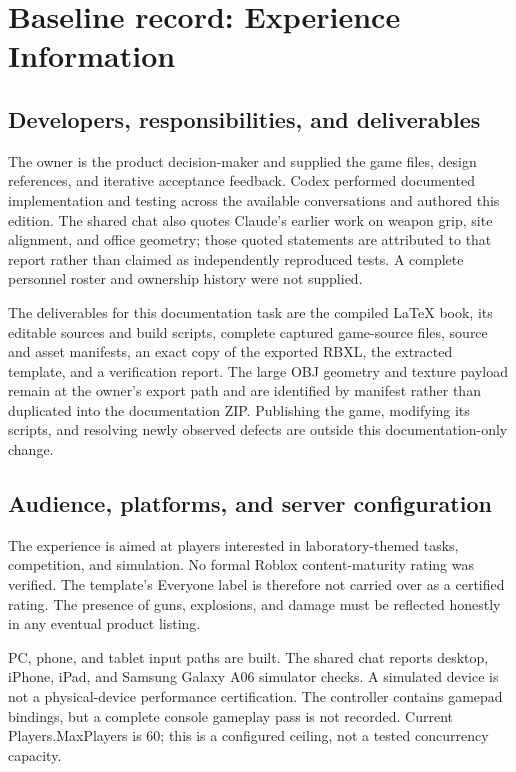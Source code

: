 \chapter{Baseline record: Experience Information}
\section{Developers, responsibilities, and deliverables}
The owner is the product decision-maker and supplied the game files, design references, and iterative acceptance feedback.\allowbreak{} Codex performed documented implementation and testing across the available conversations and authored this edition.\allowbreak{} The shared chat also quotes Claude's earlier work on weapon grip, site alignment, and office geometry; those quoted statements are attributed to that report rather than claimed as independently reproduced tests.\allowbreak{} A complete personnel roster and ownership history were not supplied.\allowbreak{}

The deliverables for this documentation task are the compiled LaTeX book, its editable sources and build scripts, complete captured game-source files, source and asset manifests, an exact copy of the exported RBXL, the extracted template, and a verification report.\allowbreak{} The large OBJ geometry and texture payload remain at the owner's export path and are identified by manifest rather than duplicated into the documentation ZIP.\allowbreak{} Publishing the game, modifying its scripts, and resolving newly observed defects are outside this documentation-only change.\allowbreak{}

\section{Audience, platforms, and server configuration}
The experience is aimed at players interested in laboratory-themed tasks, competition, and simulation.\allowbreak{} No formal Roblox content-maturity rating was verified.\allowbreak{} The template's Everyone label is therefore not carried over as a certified rating.\allowbreak{} The presence of guns, explosions, and damage must be reflected honestly in any eventual product listing.\allowbreak{}

PC, phone, and tablet input paths are built.\allowbreak{} The shared chat reports desktop, iPhone, iPad, and Samsung Galaxy A06 simulator checks.\allowbreak{} A simulated device is not a physical-device performance certification.\allowbreak{} The controller contains gamepad bindings, but a complete console gameplay pass is not recorded.\allowbreak{} Current Players.\allowbreak{}MaxPlayers is 60; this is a configured ceiling, not a tested concurrency capacity.\allowbreak{}

